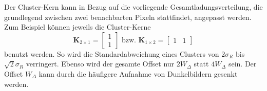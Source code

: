 \noindent
Der Cluster-Kern kann in Bezug auf die vorliegende Gesamtladungsverteilung, die grundlegend zwischen zwei benachbarten Pixeln stattfindet, angepasst werden. Zum Beispiel können jeweils die Cluster-Kerne
\begin{equation}
    \mathbf{K}_{2\times1} = \begin{bmatrix}
1\\
1
\end{bmatrix}
\text{ bzw. }
    \mathbf{K}_{1\times2} = \begin{bmatrix}
1 & 1
\end{bmatrix}
\end{equation}
benutzt werden. So wird die Standardabweichung eines Clusters von $2\sigma_R$ bis $\sqrt{2}\sigma_R$ verringert. Ebenso wird der gesamte Offset nur $2W_\Delta$ statt $4W_\Delta$ sein. Der Offset $W_\Delta$ kann durch die häufigere Aufnahme von Dunkelbildern gesenkt werden.


